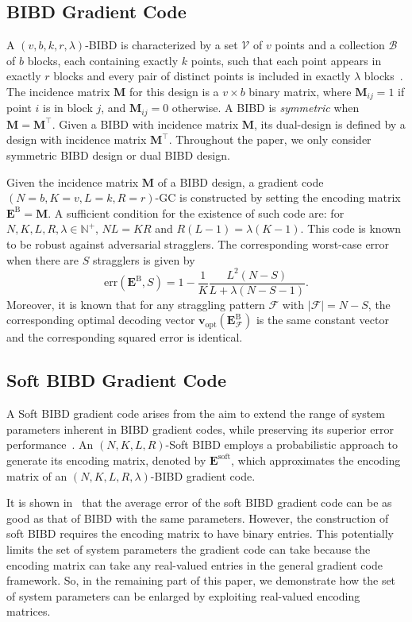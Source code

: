 \documentclass[lettersize,journal]{IEEEtran}
\newcommand{\err}[1]{\mathrm{err}(#1, S)}
\newcommand{\F}{\mathcal{F}}
\newcommand{\vopt}{\boldsymbol{v}_{\mathrm{opt}}}
\newcommand{\GPB}{\boldsymbol{E}^{\mathrm{soft}}}
\newcommand{\GB}{\boldsymbol{E}^{\mathrm{B}}}
\begin{document}
\subsection{BIBD Gradient Code}
A $(v, b, k, r, \lambda)$-BIBD is characterized by a set $\mathcal{V}$ of $v$ points and a collection $\mathcal{B}$ of $b$ blocks, each containing exactly $k$ points, such that each point appears in exactly $r$ blocks and every pair of distinct points is included in exactly $\lambda$ blocks~\cite{bibd-design}. The incidence matrix $\boldsymbol{M}$ for this design is a $ v \times b$ binary matrix, where $\boldsymbol{M}_{ij} = 1$ if point $i$ is in block $j$, and $\boldsymbol{M}_{ij} =0$ otherwise. A BIBD is \textit{symmetric} when $\boldsymbol{M} = \boldsymbol{M}^\top$. Given a BIBD with incidence matrix $\boldsymbol{M}$, its dual-design is defined by a design with incidence matrix $\boldsymbol{M}^\top$. Throughout the paper, we only consider symmetric BIBD design or dual BIBD design.


Given the incidence matrix $\boldsymbol{M}$ of a BIBD design, a gradient code $(N = b, K = v, L = k, R = r)$-GC is constructed by setting the encoding matrix $\GB = \boldsymbol{M}$. A sufficient condition for the existence of such code are: for $N, K, L, R, \lambda \in \mathbb{N}^+$, $NL = KR$ and $R(L-1) = \lambda(K-1).$ This code is known to be robust against adversarial stragglers. The corresponding worst-case error when there are $S$ stragglers is given by
\begin{equation}
\label{eq:bibd-error}
\err{\GB} = 1 - \frac{1}{K}\frac{L^2 (N-S)}{L+\lambda(N-S-1)}.
\end{equation}
Moreover, it is known that for any straggling pattern $\F$ with $|\F| = N-S$, the corresponding optimal decoding vector $\vopt(\GB_\F)$ is the same constant vector and the corresponding squared error is identical.


\subsection{Soft BIBD Gradient Code}
A Soft BIBD gradient code arises from the aim to extend the range of system parameters inherent in BIBD gradient codes, while preserving its superior error performance~\cite{soft-bibd}. An $(N, K, L, R)$-Soft BIBD employs a probabilistic approach to generate its encoding matrix, denoted by $\GPB$, which approximates the encoding matrix of an $(N, K, L, R, \lambda)$-BIBD gradient code.

It is shown in~\cite{soft-bibd} that the average error of the soft BIBD gradient code can be as good as that of BIBD with the same parameters. However, the construction of soft BIBD requires the encoding matrix to have binary entries. This potentially limits the set of system parameters the gradient code can take because the encoding matrix can take any real-valued entries in the general gradient code framework. So, in the remaining part of this paper, we demonstrate how the set of system parameters can be enlarged by exploiting real-valued encoding matrices.
\end{document}
